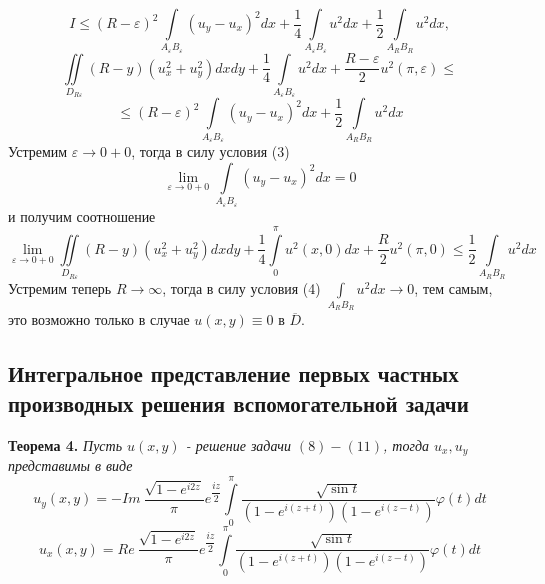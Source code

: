 \documentclass[12pt, a4paper]{article}
\begin{document}
	\begin{equation*}
		I \leq \left(R - \varepsilon\right)^2 \int\limits_{A_\varepsilon B_\varepsilon} \left( u_y - u_x\right)^2 dx + \dfrac14 \int\limits_{A_\varepsilon B_\varepsilon} u^2 dx +\dfrac12 \int\limits_{A_RB_R} u^2 dx, 
	\end{equation*}
	\begin{equation*}
		\iint\limits_{D_{R\varepsilon}} \left(R - y\right) \left(u_x^2 + u_y^2\right) dx dy + \dfrac{1}{4}\int\limits_{A_\varepsilon B_\varepsilon} u^2 dx +\dfrac{R - \varepsilon}{2}u^2(\pi, \varepsilon) \leq 
	\end{equation*}
	\begin{equation*}
		\leq \left(R - \varepsilon\right)^2 \int\limits_{A_\varepsilon B_\varepsilon} \left( u_y - u_x\right)^2 dx  +\dfrac12 \int\limits_{A_RB_R} u^2 dx
	\end{equation*}
	Устремим $\varepsilon \to 0 + 0$, тогда в силу условия (3)
	\begin{equation*}
		\lim\limits_{\varepsilon \to 0 + 0} \int\limits_{A_\varepsilon B_\varepsilon} \left(u_y - u_x\right)^2 dx = 0
	\end{equation*}
	и получим соотношение
	\begin{equation*}
		\lim\limits_{\varepsilon \to 0 + 0} \iint\limits_{D_{R\varepsilon}} \left(R - y\right) \left(u_x^2 + u_y^2 \right) dx dy + \dfrac14 \int\limits_0^\pi u^2(x,0) dx + \dfrac{R}{2}u^2(\pi,0) \leq \dfrac12 \int\limits_{A_RB_R} u^2 dx
	\end{equation*}
	Устремим теперь $R \to \infty$, тогда  в силу условия (4) $\int\limits_{A_RB_R} u^2 dx \to 0$, тем самым, это возможно только в случае $u(x,y) \equiv 0$ в $\overline{D}$.
\subsection{Интегральное представление первых частных производных решения вспомогательной задачи}
\textbf{Теорема 4.} \textit{	Пусть $u(x,y)$ - решение задачи $(8)-(11)$, тогда $u_x, u_y$ представимы в виде
	\begin{equation}
		u_y(x,y) = - Im\  \dfrac{ \sqrt{1 - e^{i2z}} }{\pi} e^{\dfrac{iz}{2}} \int\limits_0^\pi  \dfrac{\sqrt{\sin{t}}}{\left(1 - e^{i(z+t)} \right) \left(1 - e^{i(z-t)}\right)}  \varphi(t) dt
	\end{equation}
	\begin{equation}
		u_x(x,y) = Re\   \dfrac{ \sqrt{1 - e^{i2z}} }{\pi} e^{\dfrac{iz}{2}} \int\limits_0^\pi  \dfrac{\sqrt{\sin{t}}}{\left(1 - e^{i(z+t)} \right) \left(1 - e^{i(z-t)}\right)}  \varphi(t) dt
\end{equation}}
\end{document}
